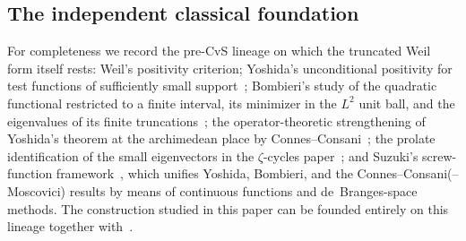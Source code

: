 \documentclass[11pt,a4paper]{article}
\begin{document}
\subsection{The independent classical foundation}\label{app:foundation}

For completeness we record the pre-CvS lineage on which the truncated Weil
form itself rests: Weil's positivity criterion; Yoshida's unconditional
positivity for test functions of sufficiently small
support~\cite{Yoshida1992}; Bombieri's study of the quadratic functional
restricted to a finite interval, its minimizer in the $L^2$ unit ball, and the
eigenvalues of its finite truncations~\cite{Bombieri2000}; the
operator-theoretic strengthening of Yoshida's theorem at the archimedean place
by Connes--Consani~\cite{ConnesConsaniSelecta}; the prolate identification of
the small eigenvectors in the $\zeta$-cycles paper~\cite{ConnesConsaniZC}; and
Suzuki's screw-function framework~\cite{SuzukiJLMS,SuzukiHilbert,Suzuki2026},
which unifies Yoshida, Bombieri, and the Connes--Consani(--Moscovici) results
by means of continuous functions and de~Branges-space methods. The
construction studied in this paper can be founded entirely on this lineage
together with~\cite{CCM2025}.
\end{document}
